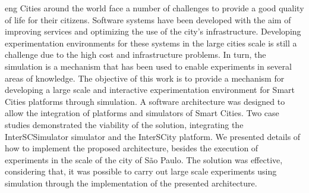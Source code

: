 \begin{resumo}{eng}
Cities around the world face a number of challenges to provide a good quality of life for their citizens.
Software systems have been developed with the aim of improving services and optimizing the use of the city's infrastructure.
Developing experimentation environments for these systems in the large cities scale is still a challenge due to the high cost and infrastructure problems.
In turn, the simulation is a mechanism that has been used to enable experiments in several areas of knowledge.
The objective of this work is to provide a mechanism for developing a large scale and interactive experimentation environment for Smart Cities platforms through simulation.
A software architecture was designed to allow the integration of platforms and simulators of Smart Cities.
Two case studies demonstrated the viability of the solution, integrating the InterSCSimulator simulator and the InterSCity platform.
We presented details of how to implement the proposed architecture, besides the execution of experiments in the scale of the city of São Paulo.
The solution was effective, considering that, it was possible to carry out large scale experiments using simulation through the implementation of the presented architecture.
\end{resumo}

\makeatletter
\if@openright\cleardoublepage\else\clearpage\fi
\makeatother



\newcommand\disablenewpage[1]{{\let\clearpage\par\let\cleardoublepage\par #1}}

